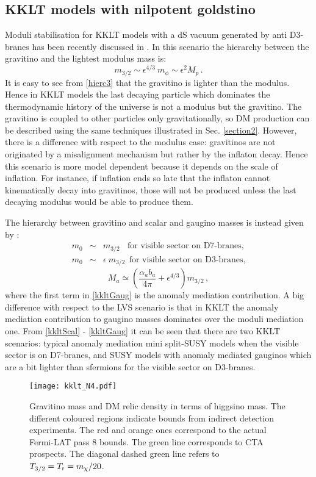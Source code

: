 \documentclass[11pt,a4paper]{article}
\newcommand{\be}{\begin{equation}}
\newcommand{\ee}{\end{equation}}
\begin{document}
\subsection{KKLT models with nilpotent goldstino}

Moduli stabilisation for KKLT models with a dS vacuum generated by anti D3-branes has been recently discussed in \cite{Aparicio:2015psl}. In this scenario the hierarchy between the gravitino and the lightest modulus mass is:
\be
m_{3/2} \sim \epsilon^{4/3}\ m_{\phi} \sim \epsilon^2 M_p\,.
\label{hierc3}
\ee
It is easy to see from \eqref{hierc3} that the gravitino is lighter than the modulus. Hence in KKLT models the last decaying particle which dominates the thermodynamic history of the universe is not a modulus but the gravitino. The gravitino is coupled to other particles only gravitationally, so DM production can be described using the same techniques illustrated in Sec. \ref{section2}. However, there is a difference with respect to the modulus case: gravitinos are not originated by a misalignment mechanism but rather by the inflaton decay. Hence this scenario is more model dependent because it depends on the scale of inflation. For instance, if inflation ends so late that the inflaton cannot kinematically decay into gravitinos, those will not be produced unless the last decaying modulus would be able to produce them.

The hierarchy between gravitino and scalar and gaugino masses is instead given by \cite{Aparicio:2015psl}:
\begin{eqnarray}
\label{kkltScal}
m	_0 &\sim & m_{3/2} \ \ \ \ \textrm{for visible sector on D7-branes,}\\
m_0 &\sim &\epsilon\ m_{3/2} \ \ \textrm{for visible sector on D3-branes,}
\end{eqnarray}
\be
M_a\simeq \left(\frac{\alpha_a b_a}{4\pi} + \epsilon^{4/3}\right) m_{3/2}\,,
\label{kkltGaug}
\ee
where the first term in \eqref{kkltGaug} is the anomaly mediation contribution. A big difference with respect to the LVS scenario is that in KKLT the anomaly mediation contribution to gaugino masses dominates over the moduli mediation one. From \eqref{kkltScal} - \eqref{kkltGaug} it can be seen that there are two KKLT scenarios: typical anomaly mediation mini split-SUSY models when the visible sector is on D7-branes, and SUSY models with anomaly mediated gauginos which are a bit lighter than sfermions for the visible sector on D3-branes. 

\begin{figure}[!t]
\centering
\texttt{[image: kklt\_N4.pdf]}
\caption{Gravitino mass and DM relic density in terms of higgsino mass. The different coloured regions indicate bounds from indirect detection experiments. The red and orange ones correspond to the actual Fermi-LAT pass 8 bounds. The green line corresponds to CTA prospects. The diagonal dashed green line refers to $T_{3/2} = T_{\rm r} = m_\chi/20$.}
\label{FigKKLT}
\end{figure}
\end{document}
